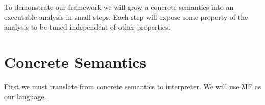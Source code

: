 \documentclass{article}
\begin{document}
To demonstrate our framework we will grow a concrete semantics into an executable analysis in small steps.
Each step will expose some property of the analysis to be tuned independent of other properties.

\section{Concrete Semantics}

First we must translate from concrete semantics to interpreter.
We will use λIF as our language.

\
\end{document}
